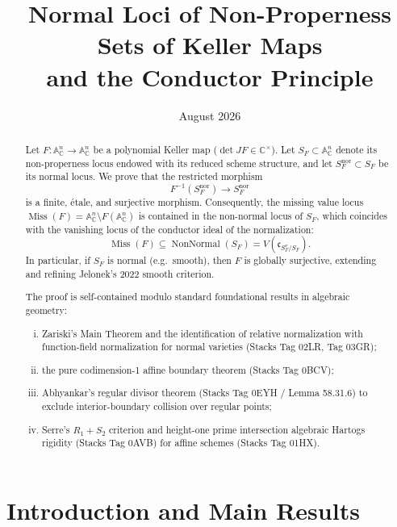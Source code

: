 \documentclass[11pt,reqno]{amsart}
\title[Normal Loci of Non-Properness Sets of Keller Maps]{Normal Loci of Non-Properness Sets of Keller Maps\\and the Conductor Principle}
\author{}
\date{August 2026}
\theoremstyle{plain}
\theoremstyle{definition}
\numberwithin{equation}{section}
\DeclareMathOperator{\NonNormal}{NonNormal}
\DeclareMathOperator{\Miss}{Miss}
\newcommand{\A}{\mathbb{A}}
\newcommand{\C}{\mathbb{C}}
\newcommand{\fc}{\mathfrak{c}}
\begin{document}
\begin{abstract}
Let $F: \A^n_\C \to \A^n_\C$ be a polynomial Keller map ($\det JF \in \C^\times$). Let $S_F \subset \A^n_\C$ denote its non-properness locus endowed with its reduced scheme structure, and let $S_F^{\mathrm{nor}} \subset S_F$ be its normal locus. We prove that the restricted morphism
\[
F^{-1}(S_F^{\mathrm{nor}}) \longrightarrow S_F^{\mathrm{nor}}
\]
is a finite, \'{e}tale, and surjective morphism. Consequently, the missing value locus $\Miss(F) = \A^n_\C \setminus F(\A^n_\C)$ is contained in the non-normal locus of $S_F$, which coincides with the vanishing locus of the conductor ideal of the normalization:
\[
\Miss(F) \subseteq \NonNormal(S_F) = V(\fc_{S_F^\nu / S_F}).
\]
In particular, if $S_F$ is normal (e.g.\ smooth), then $F$ is globally surjective, extending and refining Jelonek's 2022 smooth criterion.

The proof is self-contained modulo standard foundational results in algebraic geometry:
\begin{enumerate}[(i)]
\item Zariski's Main Theorem and the identification of relative normalization with function-field normalization for normal varieties (Stacks Tag 02LR, Tag 03GR);
\item the pure codimension-1 affine boundary theorem (Stacks Tag 0BCV);
\item Abhyankar's regular divisor theorem (Stacks Tag 0EYH / Lemma 58.31.6) to exclude interior-boundary collision over regular points;
\item Serre's $R_1+S_2$ criterion and height-one prime intersection algebraic Hartogs rigidity (Stacks Tag 0AVB) for affine schemes (Stacks Tag 01HX).
\end{enumerate}
\end{abstract}

\maketitle

\tableofcontents

\newpage

\section{Introduction and Main Results}
\end{document}
